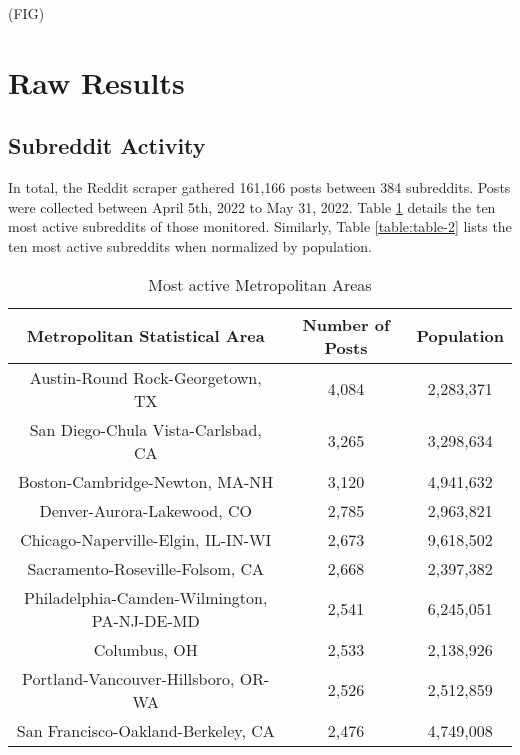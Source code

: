 \documentclass[12pt,oneside, letterpaper]{book}
\begin{document}
(FIG)

\section{Raw Results}

\subsection{Subreddit Activity}

\par In total, the Reddit scraper gathered 161,166 posts between 384 subreddits. Posts were collected between April 5th, 2022 to May 31, 2022. Table \ref{table:table-1} details the ten most active subreddits of those monitored. Similarly, Table \ref{table:table-2} lists the ten most active subreddits when normalized by population.

\begin{table}[h!]
    \centering
    \small
    \caption{Most active Metropolitan Areas}
    \begin{tabular}{| c | c | c |}
    \hline
    Metropolitan Statistical Area & Number of Posts & Population\\ \hline
    Austin-Round Rock-Georgetown, TX & 4,084 & 2,283,371 \\ \hline
    San Diego-Chula Vista-Carlsbad, CA & 3,265 & 3,298,634 \\ \hline
    Boston-Cambridge-Newton, MA-NH & 3,120 & 4,941,632 \\ \hline
    Denver-Aurora-Lakewood, CO & 2,785 & 2,963,821 \\ \hline
    Chicago-Naperville-Elgin, IL-IN-WI & 2,673 & 9,618,502 \\ \hline
    Sacramento-Roseville-Folsom, CA & 2,668 & 2,397,382 \\ \hline
    Philadelphia-Camden-Wilmington, PA-NJ-DE-MD & 2,541 & 6,245,051 \\ \hline
    Columbus, OH & 2,533 & 2,138,926 \\ \hline
    Portland-Vancouver-Hillsboro, OR-WA & 2,526 & 2,512,859 \\ \hline
    San Francisco-Oakland-Berkeley, CA & 2,476 & 4,749,008 \\ \hline
	\end{tabular}
	\label{table:table-1}
\end{table}
\end{document}
